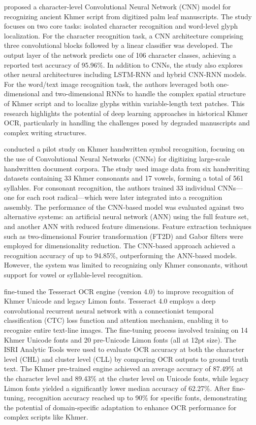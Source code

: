 \citet{Valy_8563219} proposed a character-level Convolutional Neural 
Network (CNN) model for recognizing ancient Khmer script from digitized 
palm leaf manuscripts. The study focuses on two core tasks: 
isolated character recognition and word-level glyph localization. 
For the character recognition task, a CNN architecture comprising 
three convolutional blocks followed by a linear classifier was 
developed. The output layer of the network predicts one of 106 
character classes, achieving a reported test accuracy of 95.96\%. 
In addition to CNNs, the study also explores other neural 
architectures including LSTM-RNN and hybrid CNN-RNN models. 
For the word/text image recognition task, the authors leveraged 
both one-dimensional and two-dimensional RNNs to handle the complex 
spatial structure of Khmer script and to localize glyphs within 
variable-length text patches. This research highlights the potential 
of deep learning approaches in historical Khmer OCR, particularly in 
handling the challenges posed by degraded manuscripts and complex 
writing structures.

\citet{Annanurov_2018} conducted a pilot study on Khmer handwritten 
symbol recognition, focusing on the use of Convolutional Neural 
Networks (CNNs) for digitizing large-scale handwritten document corpora. 
The study used image data from six handwriting datasets containing 
33 Khmer consonants and 17 vowels, forming a total of 561 syllables. 
For consonant recognition, the authors trained 33 individual CNNs—one 
for each root radical—which were later integrated into a recognition 
assembly. The performance of the CNN-based model was evaluated against 
two alternative systems: an artificial neural network (ANN) using the 
full feature set, and another ANN with reduced feature dimensions. 
Feature extraction techniques such as two-dimensional Fourier 
transformation (FT2D) and Gabor filters were employed for dimensionality 
reduction. The CNN-based approach achieved a recognition accuracy of 
up to 94.85\%, outperforming the ANN-based models. However, the system 
was limited to recognizing only Khmer consonants, without support for 
vowel or syllable-level recognition.

\citet{sokphyrum2019khmer} fine-tuned the Tesseract OCR engine 
(version 4.0) to improve recognition of Khmer Unicode and legacy 
Limon fonts. Tesseract 4.0 employs a deep convolutional recurrent 
neural network with a connectionist temporal classification (CTC) 
loss function and attention mechanism, enabling it to recognize entire 
text-line images. The fine-tuning process involved training on 14 Khmer 
Unicode fonts and 20 pre-Unicode Limon fonts (all at 12pt size). 
The ISRI Analytic Tools were used to evaluate OCR accuracy at both 
the character level (CHL) and cluster level (CLL) by comparing OCR 
outputs to ground truth text. The Khmer pre-trained engine achieved 
an average accuracy of 87.49\% at the character level and 89.43\% at 
the cluster level on Unicode fonts, while legacy Limon fonts yielded 
a significantly lower median accuracy of 62.27\%. After fine-tuning, 
recognition accuracy reached up to 90\% for specific fonts, demonstrating 
the potential of domain-specific adaptation to enhance OCR performance 
for complex scripts like Khmer.



